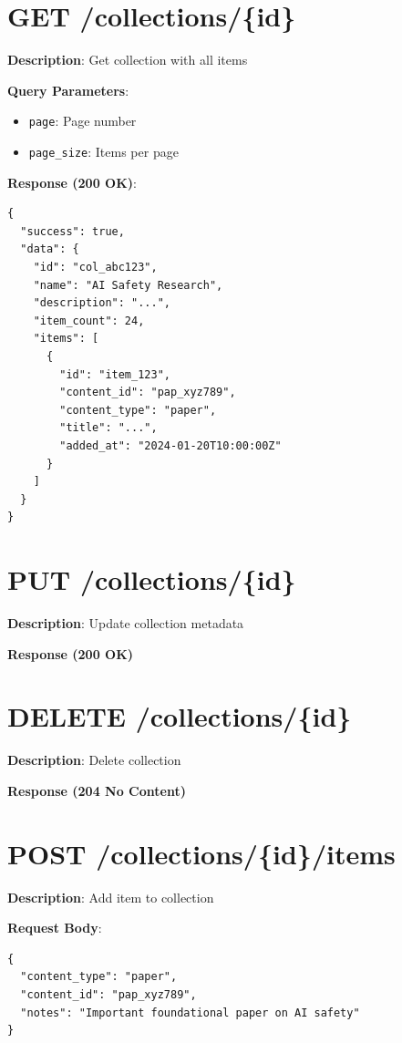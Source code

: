 \documentclass[12pt,a4paper]{report}
\begin{document}
\section{GET /collections/\{id\}}

\textbf{Description}: Get collection with all items

\textbf{Query Parameters}:
\begin{itemize}
    \item \texttt{page}: Page number
    \item \texttt{page\_size}: Items per page
\end{itemize}

\textbf{Response (200 OK)}:
\begin{lstlisting}
{
  "success": true,
  "data": {
    "id": "col_abc123",
    "name": "AI Safety Research",
    "description": "...",
    "item_count": 24,
    "items": [
      {
        "id": "item_123",
        "content_id": "pap_xyz789",
        "content_type": "paper",
        "title": "...",
        "added_at": "2024-01-20T10:00:00Z"
      }
    ]
  }
}
\end{lstlisting}

\section{PUT /collections/\{id\}}

\textbf{Description}: Update collection metadata

\textbf{Response (200 OK)}

\section{DELETE /collections/\{id\}}

\textbf{Description}: Delete collection

\textbf{Response (204 No Content)}

\section{POST /collections/\{id\}/items}

\textbf{Description}: Add item to collection

\textbf{Request Body}:
\begin{lstlisting}
{
  "content_type": "paper",
  "content_id": "pap_xyz789",
  "notes": "Important foundational paper on AI safety"
}
\end{lstlisting}
\end{document}
